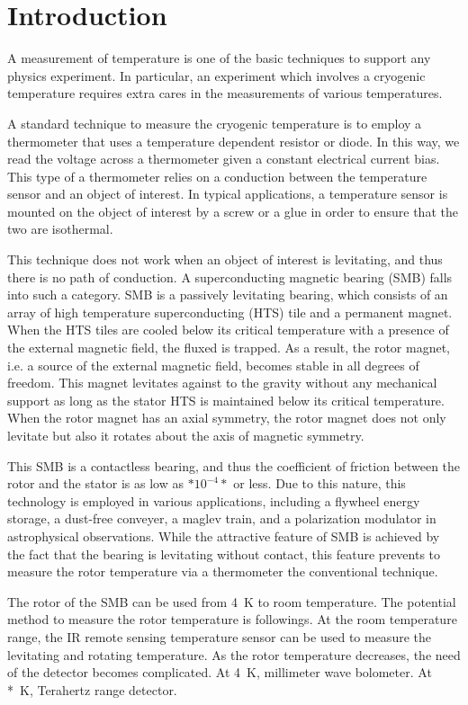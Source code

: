 \section{Introduction}

A measurement of temperature is one of the basic techniques to support any physics experiment. 
In particular, an experiment which involves a cryogenic temperature requires extra cares in the measurements of various temperatures.

A standard technique to measure the cryogenic temperature is to employ a thermometer that uses a temperature dependent resistor or diode. 
In this way, we read the voltage across a thermometer given a constant electrical current bias. 
This type of a thermometer relies on a conduction between the temperature sensor and an object of interest. 
In typical applications, a temperature sensor is mounted on the object of interest by a screw or a glue in order to ensure that the two are isothermal. 

This technique does not work when an object of interest is levitating, and thus there is no path of conduction. 
A superconducting magnetic bearing (SMB) falls into such a category. 
SMB is a passively levitating bearing, which consists of an array of high temperature superconducting (HTS) tile and a permanent magnet. 
When the HTS tiles are cooled below its critical temperature with a presence of the external magnetic field, the fluxed is trapped. 
As a result, the rotor magnet, i.e. a source of the external magnetic field, becomes stable in all degrees of freedom. 
This magnet levitates against to the gravity without any mechanical support as long as the stator HTS is maintained below its critical temperature. 
When the rotor magnet has an axial symmetry, the rotor magnet does not only levitate but also it rotates about the axis of magnetic symmetry. 

This SMB is a contactless bearing, and thus the coefficient of friction between the rotor and the stator is as low as $*10^{-4}*$ or less. 
Due to this nature, this technology is employed in various applications, including a flywheel energy storage, a dust-free conveyer, a maglev train, and a polarization modulator in astrophysical observations.
While the attractive feature of SMB is achieved by the fact that the bearing is levitating without contact, this feature prevents to measure the rotor temperature via a thermometer the conventional technique. 

The rotor of the SMB can be used from 4~K to room temperature. 
The potential method to measure the rotor temperature is followings.
At the room temperature range, the IR remote sensing temperature sensor can be used to measure the levitating and rotating temperature. 
As the rotor temperature decreases, the need of the detector becomes complicated. 
At 4~K, millimeter wave bolometer. 
At *~K, Terahertz range detector. 

